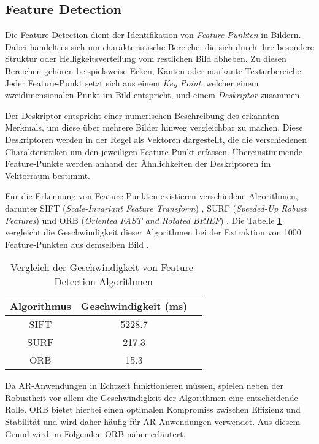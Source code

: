 \subsection{Feature Detection}

Die Feature Detection dient der Identifikation von \emph{Feature-Punkten} in Bildern. Dabei handelt es sich um charakteristische Bereiche, die sich durch ihre besondere Struktur oder Helligkeitsverteilung vom restlichen Bild abheben. Zu diesen Bereichen gehören beispielsweise Ecken, Kanten oder markante Texturbereiche. Jeder Feature-Punkt setzt sich aus einem \emph{Key Point}, welcher einem zweidimensionalen Punkt im Bild entspricht, und einem \emph{Deskriptor} zusammen. \cite{gao2021vSLAM, szeliski2022computerVision}

Der Deskriptor entspricht einer numerischen Beschreibung des erkannten Merkmals, um diese über mehrere Bilder hinweg vergleichbar zu machen. Diese Deskriptoren werden in der Regel als Vektoren dargestellt, die die verschiedenen Charakteristiken um den jeweiligen Feature-Punkt erfassen. Übereinstimmende Feature-Punkte werden anhand der Ähnlichkeiten der Deskriptoren im Vektorraum bestimmt. \cite{gao2021vSLAM, szeliski2022computerVision}

Für die Erkennung von Feature-Punkten existieren verschiedene Algorithmen, darunter SIFT (\emph{Scale-Invariant Feature Transform}) \cite{lowe1999sift}, SURF (\emph{Speeded-Up Robust Features}) \cite{bay2006surf} und ORB (\emph{Oriented FAST and Rotated BRIEF}) \cite{rublee2011orb}. Die Tabelle \ref{tab:AlgorithmComparison} vergleicht die Geschwindigkeit dieser Algorithmen bei der Extraktion von 1000 Feature-Punkten aus demselben Bild \cite{gao2021vSLAM}.

\begin{table}[ht]
    \centering
    \begin{tabular}{ccl} 
        \hline
        Algorithmus & Geschwindigkeit (ms) \\ 
        \hline
        SIFT & 5228.7 \\ 
        SURF & 217.3 \\ 
        ORB & 15.3 \\ 
        \hline
    \end{tabular}
    \caption{Vergleich der Geschwindigkeit von Feature-Detection-Algorithmen \cite{gao2021vSLAM}}
    \label{tab:AlgorithmComparison}
\end{table}

Da AR-Anwendungen in Echtzeit funktionieren müssen, spielen neben der Robustheit vor allem die Geschwindigkeit der Algorithmen eine entscheidende Rolle. ORB bietet hierbei einen optimalen Kompromiss zwischen Effizienz und Stabilität und wird daher häufig für AR-Anwendungen verwendet. Aus diesem Grund wird im Folgenden ORB näher erläutert. \cite{gao2021vSLAM, rublee2011orb}

